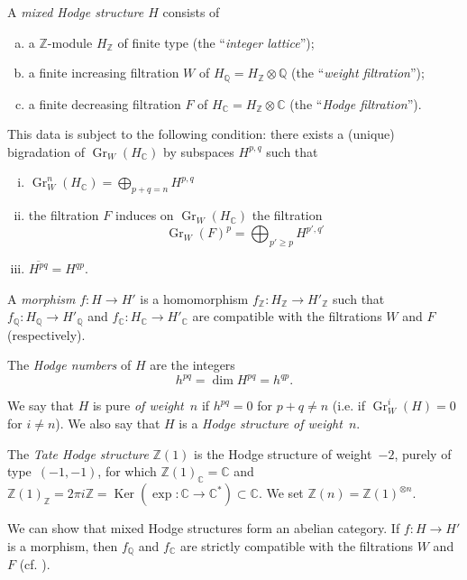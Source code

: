 \documentclass{article}
\theoremstyle{plain}
\theoremstyle{definition}
\newenvironment{definition}[1]
    {\renewcommand\theinnercustomdefinition{#1}\innercustomdefinition}
    {\endinnercustomdefinition}
\newcommand{\ZZ}{\mathbb{Z}}
\newcommand{\QQ}{\mathbb{Q}}
\newcommand{\CC}{\mathbb{C}}
\DeclareMathOperator{\Gr}{Gr}
\DeclareMathOperator{\Ker}{Ker}
\renewcommand{\geq}{\geqslant}
\begin{document}
\begin{definition}{1.1}
  A \emph{mixed Hodge structure $H$} consists of
  \begin{enumerate}[(a)]
    \item a $\ZZ$-module $H_\ZZ$ of finite type (the ``\emph{integer lattice}'');
    \item a finite increasing filtration $W$ of $H_\QQ = H_\ZZ\otimes\QQ$ (the ``\emph{weight filtration}'');
    \item a finite decreasing filtration $F$ of $H_\CC = H_\ZZ\otimes\CC$ (the ``\emph{Hodge filtration}'').
  \end{enumerate}
  This data is subject to the following condition:
  there exists a (unique) bigradation of $\Gr_W(H_\CC)$ by subspaces $H^{p,q}$ such that
  \begin{enumerate}[(i)]
    \item $\Gr_W^n(H_\CC) = \bigoplus_{p+q=n}H^{p,q}$
    \item the filtration $F$ induces on $\Gr_W(H_\CC)$ the filtration
      \[
        \Gr_W(F)^p = \bigoplus_{p'\geq p} H^{p',q'}
      \]
    \item $\overline{H^{pq}}=H^{qp}$.
  \end{enumerate}
\end{definition}

A \emph{morphism} $f\colon H\to H'$ is a homomorphism $f_\ZZ\colon H_\ZZ\to H'_\ZZ$ such that $f_\QQ\colon H_\QQ\to H'_\QQ$ and $f_\CC\colon H_\CC\to H'_\CC$ are compatible with the filtrations $W$ and $F$ (respectively).

The \emph{Hodge numbers} of $H$ are the integers
\[
  h^{pq} = \dim H^{pq} = h^{qp}.
\tag{1.2}
\]

We say that $H$ is pure \emph{of weight~$n$} if $h^{pq}=0$ for $p+q\neq n$ (i.e. if $\Gr_W^i(H)=0$ for $i\neq n$).
We also say that $H$ is a \emph{Hodge structure of weight~$n$}.

The \emph{Tate Hodge structure} $\ZZ(1)$ is the Hodge structure of weight~$-2$, purely of type~$(-1,-1)$, for which $\ZZ(1)_\CC=\CC$ and $\ZZ(1)_\ZZ = 2\pi i\ZZ = \Ker(\exp\colon\CC\to\CC^*)\subset\CC$.
We set $\ZZ(n)=\ZZ(1)^{\otimes n}$.

We can show that mixed Hodge structures form an abelian category.
If $f\colon H\to H'$ is a morphism, then $f_\QQ$ and $f_\CC$ are strictly compatible with the filtrations $W$ and $F$ (cf. \cite[2.3.5]{1}).


\section{}
\label{2}
\end{document}
